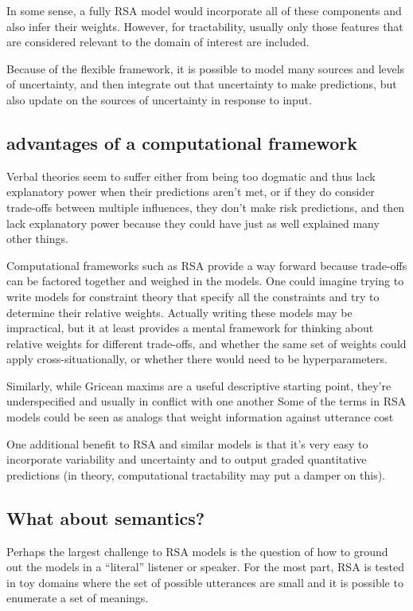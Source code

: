 \documentclass[]{article}
\begin{document}
In some sense, a fully RSA model would incorporate all of these components and also infer their weights. However, for tractability, usually only those features that are considered relevant to the domain of interest are included.

Because of the flexible framework, it is possible to model many sources and levels of uncertainty, and then integrate out that uncertainty to make predictions, but also update on the sources of uncertainty in response to input. 

\subsection{advantages of a computational framework}

Verbal theories seem to suffer either from being too dogmatic and thus lack explanatory power when their predictions aren't met, or if they do consider trade-offs between multiple influences, they don't make risk predictions, and then lack explanatory power because they could have just as well explained many other things. 

Computational frameworks such as RSA provide a way forward because trade-offs can be factored together and weighed in the models. One could imagine trying to write models for constraint theory that specify all the constraints and try to determine their relative weights. Actually writing these models may be impractical, but it at least provides a mental framework for thinking about relative weights for different trade-offs, and whether the same set of weights could apply cross-situationally, or whether there would need to be hyperparameters. 

Similarly, while Gricean maxims are a useful descriptive starting point, they're underspecified and usually in conflict with one another %
Some of the terms in RSA models could be seen as analogs that weight information against utterance cost %

One additional benefit to RSA and similar models is that it's very easy to incorporate variability and uncertainty and to output graded quantitative predictions (in theory, computational tractability may put a damper on this). 

\subsection{What about semantics?}

Perhaps the largest challenge to RSA models is the question of how to ground out the models in a ``literal'' listener or speaker. For the most part, RSA is tested in toy domains where the set of possible utterances are small and it is possible to enumerate a set of meanings.
\end{document}
